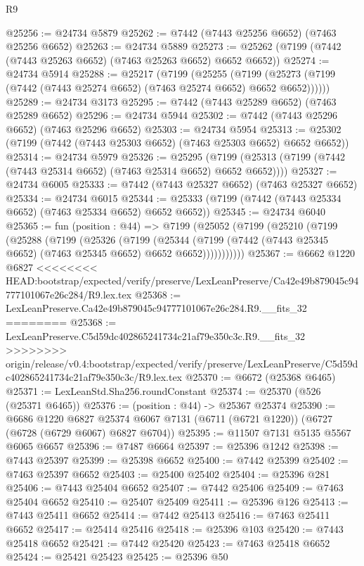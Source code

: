 \begin{lexlean}{R9}
\begin{coremodule}
{{{{{{{{{{{{{{{{{{{{{{{{{{{{{{{{{{{{{{{{{{{{{{{{{{{{{{{{{{{{{{{{{{{{{{{{{{{{{{{{{{{{@25256 := @24734 @5879
@25262 := @7442 (@7443 @25256 @6652) (@7463 @25256 @6652)
@25263 := @24734 @5889
@25273 := @25262 (@7199 (@7442 (@7443 @25263 @6652) (@7463 @25263 @6652) @6652 @6652))
@25274 := @24734 @5914
@25288 := @25217
    (@7199
      (@25255
        (@7199 (@25273 (@7199 (@7442 (@7443 @25274 @6652) (@7463 @25274 @6652) @6652 @6652))))))
@25289 := @24734 @3173
@25295 := @7442 (@7443 @25289 @6652) (@7463 @25289 @6652)
@25296 := @24734 @5944
@25302 := @7442 (@7443 @25296 @6652) (@7463 @25296 @6652)
@25303 := @24734 @5954
@25313 := @25302 (@7199 (@7442 (@7443 @25303 @6652) (@7463 @25303 @6652) @6652 @6652))
@25314 := @24734 @5979
@25326 := @25295
    (@7199 (@25313 (@7199 (@7442 (@7443 @25314 @6652) (@7463 @25314 @6652) @6652 @6652))))
@25327 := @24734 @6005
@25333 := @7442 (@7443 @25327 @6652) (@7463 @25327 @6652)
@25334 := @24734 @6015
@25344 := @25333 (@7199 (@7442 (@7443 @25334 @6652) (@7463 @25334 @6652) @6652 @6652))
@25345 := @24734 @6040
@25365 := fun (position : @44) =>
  @7199
    (@25052
      (@7199
        (@25210
          (@7199
            (@25288
              (@7199
                (@25326
                  (@7199
                    (@25344
                      (@7199 (@7442 (@7443 @25345 @6652) (@7463 @25345 @6652) @6652 @6652)))))))))))
@25367 := @6662 @1220 @6827
<<<<<<<< HEAD:bootstrap/expected/verify/preserve/LexLeanPreserve/Ca42e49b879045c94777101067e26c284/R9.lex.tex
@25368 := LexLeanPreserve.Ca42e49b879045c94777101067e26c284.R9.__fits_32
========
@25368 := LexLeanPreserve.C5d59dc402865241734c21af79e350c3c.R9.__fits_32
>>>>>>>> origin/release/v0.4:bootstrap/expected/verify/preserve/LexLeanPreserve/C5d59dc402865241734c21af79e350c3c/R9.lex.tex
@25370 := @6672 (@25368 @6465)
@25371 := LexLeanStd.Sha256.roundConstant
@25374 := @25370 (@526 (@25371 @6465))
@25376 := (position : @44) -> @25367 @25374
@25390 := @6686
    @1220
    @6827
    @25374
    @6067
    @7131
    (@6711 (@6721 @1220))
    (@6727 (@6728 (@6729 @6067) @6827 @6704))
@25395 := @11507 @7131 @5135 @5567 @6065 @6657
@25396 := @7487 @6664
@25397 := @25396 @1242
@25398 := @7443 @25397
@25399 := @25398 @6652
@25400 := @7442 @25399
@25402 := @7463 @25397 @6652
@25403 := @25400 @25402
@25404 := @25396 @281
@25406 := @7443 @25404 @6652
@25407 := @7442 @25406
@25409 := @7463 @25404 @6652
@25410 := @25407 @25409
@25411 := @25396 @126
@25413 := @7443 @25411 @6652
@25414 := @7442 @25413
@25416 := @7463 @25411 @6652
@25417 := @25414 @25416
@25418 := @25396 @103
@25420 := @7443 @25418 @6652
@25421 := @7442 @25420
@25423 := @7463 @25418 @6652
@25424 := @25421 @25423
@25425 := @25396 @50
}}}}}}}}}}}}}}}}}}}}}}}}}}}}}}}}}}}}}}}}}}}}}}}}}}}}}}}}}}}}}}}}}}}}}}}}}}}}}}}}}}}}
\end{coremodule}
\end{lexlean}
